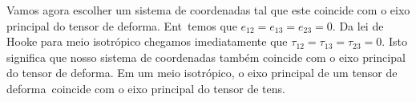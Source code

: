 Vamos agora escolher um sistema de coordenadas tal que
este coincide com o eixo principal do tensor de
deforma\cao. Ent\ao\ temos que $e_{12}=e_{13}=e_{23}=0$.
Da lei de Hooke para meio isotr\'opico chegamos
imediatamente que $\tau_{12}=\tau_{13}=\tau_{23}=0$.
Isto significa que nosso sistema de coordenadas tamb\'em
coincide com o eixo principal do tensor de deforma\cao.
Em um meio isotr\'opico, o eixo principal de um tensor
de deforma\cao\ coincide com o eixo principal do tensor
de tens\ao.

